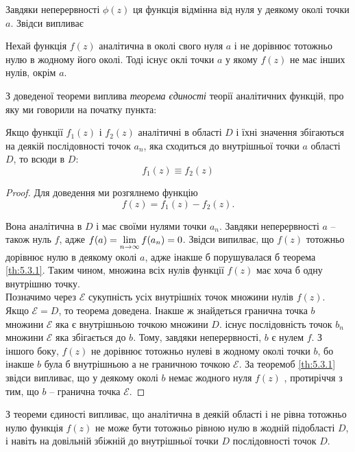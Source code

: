 Завдяки неперервності $\phi(z)$ ця функція відмінна від нуля у деякому околі точки $a$. Звідси випливає
\begin{theorem}
	\label{th:5.3.1}
	Нехай функція $f(z)$ аналітична в околі свого нуля $a$ і не дорівнює тотожньо нулю в жодному його околі. Тоді існує оклі точки $a$ у якому $f(z)$ не має інших нулів, окрім $a$.
\end{theorem}

З доведеної теореми виплива \textit{теорема єдиності} теорії аналітичних функцій, про яку ми говорили на початку пункта:
\begin{theorem}
	Якщо функції $f_1(z)$ і $f_2(z)$ аналітичні в області $D$ і їхні значення збігаються на деякій послідовності точок $a_n$, яка сходиться до внутрішньої точки $a$ області $D$, то всюди в $D$:
	\begin{equation*}
		f_1(z) \equiv f_2(z)
	\end{equation*}
\end{theorem}
\begin{proof}
	Для доведення ми розгялнемо функцію
	\begin{equation*}
		f(z) = f_1(z) - f_2(z).
	\end{equation*}

	Вона аналітична в $D$ і має своїми нулями точки $a_n$. Завдяки неперервності $a$ -- також нуль $f$, адже $f(a) = \displaystyle\lim\limits_{n\to\infty} f(a_n) = 0$. Звідси випилває, що $f(z)$ тотожньо дорівнює нулю в деякому околі $a$, адже інакше б порушувалася б теорема \ref{th:5.3.1}. Таким чином, множина всіх нулів функції $f(z)$ має хоча б одну внутрішню точку. \\

	Позначимо через $\mathcal{E}$ сукупність усіх внутрішніх точок множини нулів $f(z)$. Якщо $\mathcal{E} = D$, то теорема доведена. Інакше ж знайдеться гранична точка $b$ множини $\mathcal{E}$ яка є внутрішньою точкою множини $D$. існує послідовність точок $b_n$ множини $\mathcal{E}$ яка збігається до $b$. Тому, завдяки неперервності, $b$ є нулем $f$. З іншого боку, $f(z)$ не дорівнює тотожньо нулеві в жодному околі точки $b$, бо інакше $b$ була б внутрішньою а не граничною точкою $\mathcal{E}$. За теоремоб \ref{th:5.3.1} звідси випливає, що у деякому околі $b$ немає жодного нуля $f(z)$ , протиріччя з тим, що $b$ -- гранична точка $\mathcal{E}$.
\end{proof}

З теореми єдиності випливає, що аналітична в деякій області і не рівна тотожньо нулю функція $f(z)$ не може бути тотожньо рівною нулю в жодній підобласті $D$, і навіть на довільній збіжній до внутрішньої точки $D$ послідовності точок $D$. \\

